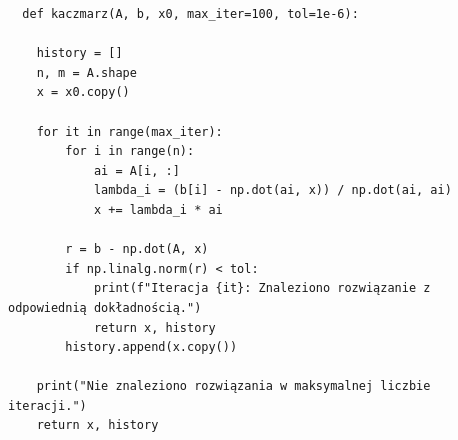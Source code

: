 \documentclass{article}
\begin{document}
\begin{lstlisting}
  def kaczmarz(A, b, x0, max_iter=100, tol=1e-6):
    
    history = []
    n, m = A.shape
    x = x0.copy()

    for it in range(max_iter):
        for i in range(n):
            ai = A[i, :]
            lambda_i = (b[i] - np.dot(ai, x)) / np.dot(ai, ai)
            x += lambda_i * ai

        r = b - np.dot(A, x)
        if np.linalg.norm(r) < tol:
            print(f"Iteracja {it}: Znaleziono rozwiązanie z odpowiednią dokładnością.")
            return x, history
        history.append(x.copy())

    print("Nie znaleziono rozwiązania w maksymalnej liczbie iteracji.")
    return x, history
\end{lstlisting}
\end{document}
